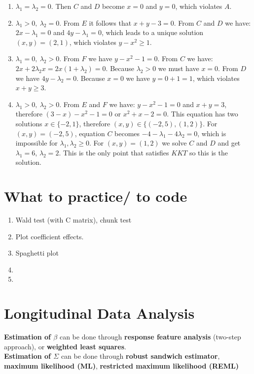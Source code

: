 \documentclass[]{article}
\begin{document}
\begin{enumerate}[1)]
	\item $\lambda_1 = \lambda_2=0$. Then $C$ and $D$ become $x=0$ and $y=0$, which violates $A$.
	\item $\lambda_1>0,~ \lambda_2=0$. From $E$ it follows that $x+y -3=0$. From $C$ and $D$ we have: $2x-\lambda_1=0$ and $4y-\lambda_1=0$, which leads to a unique solution $(x,y)=(2,1)$, which violates $y-x^2\geq 1$.
	\item $\lambda_1 =0,~ \lambda_2>0$. From $F$ we have $y - x^2 - 1=0$. From $C$ we have: $2x+2\lambda_2x=2x(1+\lambda_2)=0$. Because $\lambda_2>0$ we must have $x=0$. From $D$
	we have $4y-\lambda_2=0$. Because $x=0$ we have $y= 0 + 1 = 1$, which violates $x+y\geq 3$.
	\item $\lambda_1>0,~ \lambda_2>0$. From $E$ and $F$ we have: $y-x^2 - 1=0$ and $x+y=3$, therefore $(3-x) - x^2 - 1=0$ or $x^2 + x - 2=0$. This equation has two solutions $x \in \{-2, 1\}$, therefore $(x,y) \in \{(-2, 5), (1, 2)\}$. For $(x,y)=(-2, 5)$, equation $C$ becomes $-4-\lambda_1 - 4\lambda_2=0$, which is impossible for $\lambda_1,\lambda_2 \geq 0$. For $(x,y)=(1, 2)$ we solve $C$ and $D$ and get $\lambda_1 = 6$, $\lambda_2=2$. This is the only point that satisfies $KKT$ so this is the solution.
\end{enumerate}


\section{What to practice/ to code}
\begin{enumerate}[1)]
	\item Wald test (with C matrix), chunk test
	\item Plot coefficient effects.
	\item Spaghetti plot
	\item
	\item
\end{enumerate}

\clearpage



\section{Longitudinal Data Analysis}
\textbf{Estimation of $\beta$} can be done through \textbf{response feature analysis} (two-step approach), or \textbf{weighted least squares}.\\
\textbf{Estimation of $\Sigma$} can be done through \textbf{robust sandwich estimator}, \textbf{maximum likelihood (ML)}, \textbf{restricted maximum likelihood (REML)}
\end{document}
